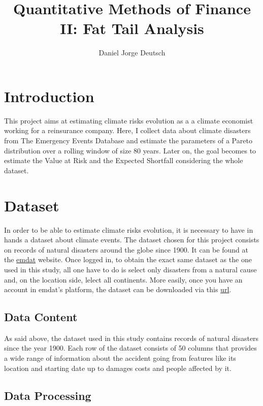 \documentclass[paper=a4, fontsize=11pt]{scrartcl} %
\title{Quantitative Methods of Finance II: Fat Tail Analysis}
\author{Daniel Jorge Deutsch}
\date{\mydate}
\begin{document}
\maketitle
\setcounter{tocdepth}{2}
\tableofcontents


\section{Introduction}
This project aims at estimating climate risks evolution as a a climate economist working for a reinsurance company. Here, I collect data about climate disasters from The Emergency Events Database and estimate the parameters of a Pareto distribution over a rolling window of size 80 years. Later on, the goal becomes to estimate the Value at Risk and the Expected Shortfall considering the whole dataset. 

\section{Dataset}
In order to be able to estimate climate risks evolution, it is necessary to have in hands a dataset about climate events. The dataset chosen for this project consists on records of natural disasters around the globe since 1900. It can be found at the \href{https://public.emdat.be/data}{emdat} website. Once logged in, to obtain the exact same dataset as the one used in this study, all one have to do is select only disasters from a natural cause and, on the location side, lelect all continents. More easily, once you have an account in emdat's platform, the dataset can be downloaded via this \href{https://public.emdat.be/api/files/emdat_public_2022_01_24_query_uid-LeeRPA.xlsx}{url}.

\subsection{Data Content}

As said above, the dataset used in this study contains records of natural disasters since the year 1900. Each row of the dataset consists of 50 columns that provides a wide range of information about the accident going from features like its location and starting date up to damages costs and people affected by it.

\subsection{Data Processing}
\end{document}
